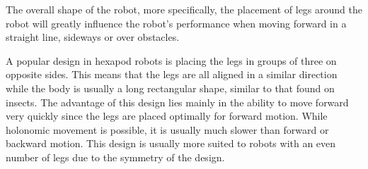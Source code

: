 The overall shape of the robot, more specifically, the placement of legs around the robot will greatly influence the robot's performance when moving forward in a straight line, sideways or over obstacles.

A popular design in hexapod robots is placing the legs in groups of three on opposite sides. This means that the legs are all aligned in a similar direction while the body is usually a long rectangular shape, similar to that found on insects. The advantage of this design lies mainly in the ability to move forward very quickly since the legs are placed optimally for forward motion. While holonomic movement is possible, it is usually much slower than forward or backward motion. This design is usually more suited to robots with an even number of legs due to the symmetry of the design.

